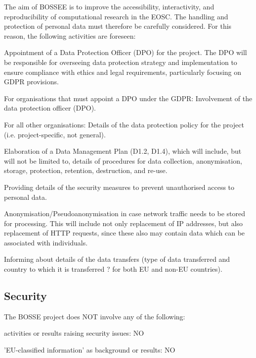 The aim of BOSSEE is to improve the accessibility, interactivity, and reproducibility of computational research in the EOSC. The handling and protection of personal data must therefore be carefully considered. For this reason, the following activities are foreseen:
\begin{compactitem}
\item Appointment of a Data Protection Officer (DPO) for the project. The DPO will be responsible for overseeing data protection strategy and implementation to ensure compliance with ethics and legal requirements, particularly focusing on GDPR provisions.
\item For organisations that must appoint a DPO under the GDPR: Involvement of the data protection officer (DPO).
\item For all other organisations: Details of the data protection policy for the project (i.e. project-specific, not general). 
\item Elaboration of a Data Management Plan (D1.2, D1.4), which will include, but will not be limited to, details of procedures for data collection, anonymisation, storage, protection, retention, destruction, and re-use.
\item Providing details of the security measures to prevent unauthorised access to personal data.
\item Anonymisation/Pseudoanonymisation in case network traffic needs to be stored for processing. This will include not only replacement of IP addresses, but also replacement of HTTP requests, since these also may contain data which can be associated with individuals.
\item Informing about details of the data transfers (type of data transferred and country to which it is transferred ? for both EU and non-EU countries). 
\end{compactitem}

\subsection{Security}

The BOSSE project does NOT involve any of the following:

\begin{compactitem}
\item activities or results raising security issues: NO
\item 'EU-classified information' as background or results: NO
\end{compactitem}

